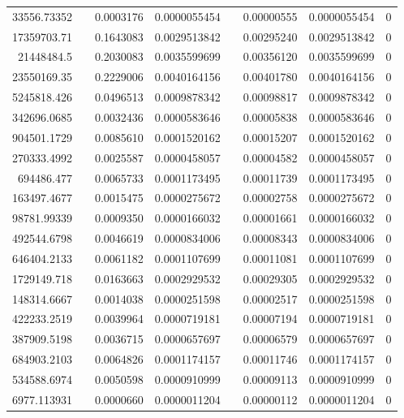 \documentclass[
journal=jacsat, %
manuscript=article]{achemso}
\begin{document}
\begin{table}[htbp]
{\begin{tabular}{rrrrrrrr}
    33556.73352 &       & 0.0003176 & 0.0000055454 &       & 0.00000555 & 0.0000055454 & 0 \\
    17359703.71 &       & 0.1643083 & 0.0029513842 &       & 0.00295240 & 0.0029513842 & 0 \\
    21448484.5 &       & 0.2030083 & 0.0035599699 &       & 0.00356120 & 0.0035599699 & 0 \\
    23550169.35 &       & 0.2229006 & 0.0040164156 &       & 0.00401780 & 0.0040164156 & 0 \\
    5245818.426 &       & 0.0496513 & 0.0009878342 &       & 0.00098817 & 0.0009878342 & 0 \\
    342696.0685 &       & 0.0032436 & 0.0000583646 &       & 0.00005838 & 0.0000583646 & 0 \\
    904501.1729 &       & 0.0085610 & 0.0001520162 &       & 0.00015207 & 0.0001520162 & 0 \\
    270333.4992 &       & 0.0025587 & 0.0000458057 &       & 0.00004582 & 0.0000458057 & 0 \\
    694486.477 &       & 0.0065733 & 0.0001173495 &       & 0.00011739 & 0.0001173495 & 0 \\
    163497.4677 &       & 0.0015475 & 0.0000275672 &       & 0.00002758 & 0.0000275672 & 0 \\
    98781.99339 &       & 0.0009350 & 0.0000166032 &       & 0.00001661 & 0.0000166032 & 0 \\
    492544.6798 &       & 0.0046619 & 0.0000834006 &       & 0.00008343 & 0.0000834006 & 0 \\
    646404.2133 &       & 0.0061182 & 0.0001107699 &       & 0.00011081 & 0.0001107699 & 0 \\
    1729149.718 &       & 0.0163663 & 0.0002929532 &       & 0.00029305 & 0.0002929532 & 0 \\
    148314.6667 &       & 0.0014038 & 0.0000251598 &       & 0.00002517 & 0.0000251598 & 0 \\
    422233.2519 &       & 0.0039964 & 0.0000719181 &       & 0.00007194 & 0.0000719181 & 0 \\
    387909.5198 &       & 0.0036715 & 0.0000657697 &       & 0.00006579 & 0.0000657697 & 0 \\
    684903.2103 &       & 0.0064826 & 0.0001174157 &       & 0.00011746 & 0.0001174157 & 0 \\
    534588.6974 &       & 0.0050598 & 0.0000910999 &       & 0.00009113 & 0.0000910999 & 0 \\
    6977.113931 &       & 0.0000660 & 0.0000011204 &       & 0.00000112 & 0.0000011204 & 0 \\

\end{tabular}}
\end{table}
\end{document}
